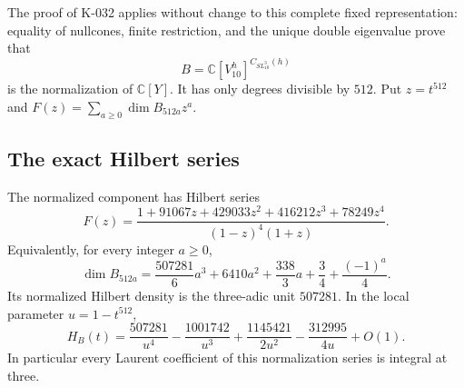 The proof of K-032 applies without change to this complete fixed
representation: equality of nullcones, finite restriction, and the
unique double eigenvalue prove that
\[
 B=\mathbb C[V_{10}^h]^{C_{SL_{10}^3}(h)}
\]
is the normalization of $\mathbb C[Y]$.  It has only degrees
divisible by $512$.  Put $z=t^{512}$ and
$F(z)=\sum_{a\ge0}\dim B_{512a}z^a$.

\subsection*{The exact Hilbert series}

\begin{theorem}[K-033b]
The normalized component has Hilbert series
\[
 F(z)=\frac{1+91067z+429033z^2+416212z^3+78249z^4}
                  {(1-z)^4(1+z)}.                     \tag{K-033c}
\]
Equivalently, for every integer $a\ge0$,
\[
 \dim B_{512a}
  =\frac{507281}{6}a^3+6410a^2+\frac{338}{3}a
                     +\frac34+\frac{(-1)^a}{4}.        \tag{K-033d}
\]
Its normalized Hilbert density is the three-adic unit $507281$.
In the local parameter $u=1-t^{512}$,
\[
 H_B(t)=\frac{507281}{u^4}-\frac{1001742}{u^3}
       +\frac{1145421}{2u^2}-\frac{312995}{4u}+O(1).
                                                        \tag{K-033e}
\]
In particular every Laurent coefficient of this normalization
series is integral at three.
\end{theorem}

